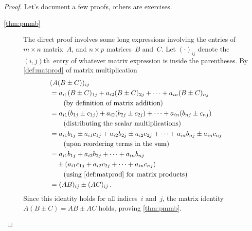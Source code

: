 \begin{proof} 
Let's document a few proofs, others are exercises.
\begin{description}
\item[\ref{thm:pmmb}]
The direct proof involves some long expressions involving the entries of \(m\times n\) matrix~\(A\), and \(n\times p\) matrices~\(B\) and~\(C\).
Let \((\cdot)_{ij}\) denote the \((i,j)\)th~entry of whatever matrix expression is inside the parentheses.
By \autoref{def:matprod} of matrix multiplication
\begin{align*}
&(A(B\pm C))_{ij}
\\&=a_{i1}(B\pm C)_{1j}+a_{i2}(B\pm C)_{2j}+\cdots+a_{in}(B\pm C)_{nj}
\\&\qquad(\text{by definition of matrix addition})
\\&=a_{i1}(b_{1j}\pm c_{1j})+a_{i2}(b_{2j}\pm c_{2j})+\cdots+a_{in}(b_{nj}\pm c_{nj})
\\&\qquad(\text{distributing the scalar multiplications})
\\&=a_{i1}b_{1j}\pm a_{i1}c_{1j}+a_{i2}b_{2j}\pm a_{i2}c_{2j}+\cdots+a_{in}b_{nj}\pm a_{in}c_{nj}
\\&\qquad(\text{upon reordering terms in the sum})
\\&=a_{i1}b_{1j}+a_{i2}b_{2j}+\cdots+a_{in}b_{nj}
\\&\quad{}\pm (a_{i1}c_{1j}+ a_{i2}c_{2j}+\cdots +a_{in}c_{nj})
\\&\qquad(\text{using \autoref{def:matprod} for matrix products})
\\&=(AB)_{ij} \pm (AC)_{ij}\,.
\end{align*}
Since this identity holds for all indices~\(i\) and~\(j\), the matrix identity \(A(B\pm C)=AB\pm AC\) holds, proving \autoref{thm:pmmb}.



\end{description}
\end{proof}
